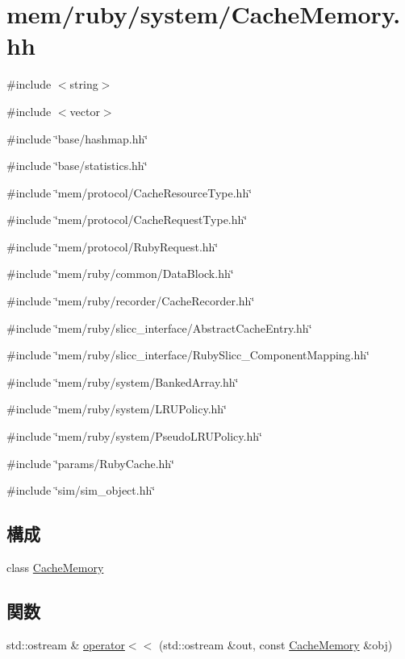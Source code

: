 \hypertarget{CacheMemory_8hh}{
\section{mem/ruby/system/CacheMemory.hh}
\label{CacheMemory_8hh}
}
{\ttfamily \#include $<$string$>$}\par
{\ttfamily \#include $<$vector$>$}\par
{\ttfamily \#include \char`\"{}base/hashmap.hh\char`\"{}}\par
{\ttfamily \#include \char`\"{}base/statistics.hh\char`\"{}}\par
{\ttfamily \#include \char`\"{}mem/protocol/CacheResourceType.hh\char`\"{}}\par
{\ttfamily \#include \char`\"{}mem/protocol/CacheRequestType.hh\char`\"{}}\par
{\ttfamily \#include \char`\"{}mem/protocol/RubyRequest.hh\char`\"{}}\par
{\ttfamily \#include \char`\"{}mem/ruby/common/DataBlock.hh\char`\"{}}\par
{\ttfamily \#include \char`\"{}mem/ruby/recorder/CacheRecorder.hh\char`\"{}}\par
{\ttfamily \#include \char`\"{}mem/ruby/slicc\_\-interface/AbstractCacheEntry.hh\char`\"{}}\par
{\ttfamily \#include \char`\"{}mem/ruby/slicc\_\-interface/RubySlicc\_\-ComponentMapping.hh\char`\"{}}\par
{\ttfamily \#include \char`\"{}mem/ruby/system/BankedArray.hh\char`\"{}}\par
{\ttfamily \#include \char`\"{}mem/ruby/system/LRUPolicy.hh\char`\"{}}\par
{\ttfamily \#include \char`\"{}mem/ruby/system/PseudoLRUPolicy.hh\char`\"{}}\par
{\ttfamily \#include \char`\"{}params/RubyCache.hh\char`\"{}}\par
{\ttfamily \#include \char`\"{}sim/sim\_\-object.hh\char`\"{}}\par
\subsection*{構成}
\begin{DoxyCompactItemize}
\item 
class \hyperlink{classCacheMemory}{CacheMemory}
\end{DoxyCompactItemize}
\subsection*{関数}
\begin{DoxyCompactItemize}
\item 
std::ostream \& \hyperlink{CacheMemory_8hh_a01bb45d3868bc4af2565a556eeec2f6f}{operator$<$$<$} (std::ostream \&out, const \hyperlink{classCacheMemory}{CacheMemory} \&obj)
\end{DoxyCompactItemize}


